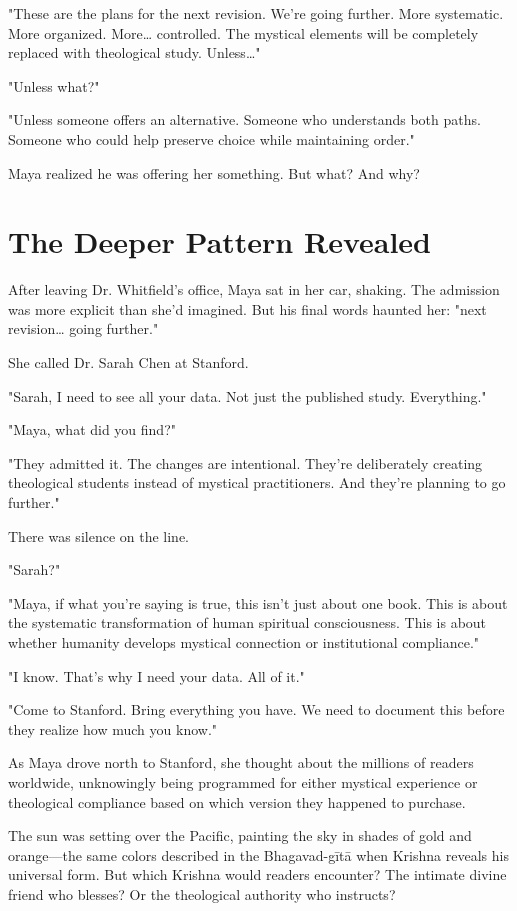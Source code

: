 \documentclass[11pt,twoside]{book}
\begin{document}
"These are the plans for the next revision. We're going further. More systematic. More organized. More\ldots{} controlled. The mystical elements will be completely replaced with theological study. Unless\ldots{}"

"Unless what?"

"Unless someone offers an alternative. Someone who understands both paths. Someone who could help preserve choice while maintaining order."

Maya realized he was offering her something. But what? And why?
\section*{The Deeper Pattern Revealed}
\label{sec:org585ef0e}

After leaving Dr. Whitfield's office, Maya sat in her car, shaking. The admission was more explicit than she'd imagined. But his final words haunted her: "next revision\ldots{} going further."

She called Dr. Sarah Chen at Stanford.

"Sarah, I need to see all your data. Not just the published study. Everything."

"Maya, what did you find?"

"They admitted it. The changes are intentional. They're deliberately creating theological students instead of mystical practitioners. And they're planning to go further."

There was silence on the line.

"Sarah?"

"Maya, if what you're saying is true, this isn't just about one book. This is about the systematic transformation of human spiritual consciousness. This is about whether humanity develops mystical connection or institutional compliance."

"I know. That's why I need your data. All of it."

"Come to Stanford. Bring everything you have. We need to document this before they realize how much you know."

As Maya drove north to Stanford, she thought about the millions of readers worldwide, unknowingly being programmed for either mystical experience or theological compliance based on which version they happened to purchase.

The sun was setting over the Pacific, painting the sky in shades of gold and orange—the same colors described in the Bhagavad-gītā when Krishna reveals his universal form. But which Krishna would readers encounter? The intimate divine friend who blesses? Or the theological authority who instructs?
\end{document}
